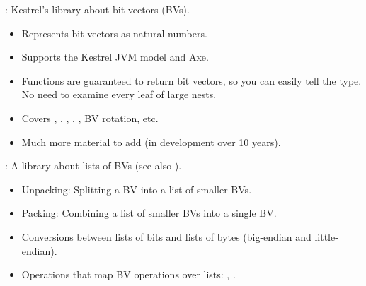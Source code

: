 \begin{frame}

\newlibtitle

:
Kestrel's library about bit-vectors (BVs).
\begin{itemize}
\item Represents bit-vectors as natural numbers.
\item Supports the Kestrel JVM model and Axe.
\item Functions are guaranteed to return bit vectors, so you can easily tell the
  type.  No need to examine every leaf of large nests.
\item Covers , , , , , BV rotation, etc.
\item Much more material to add (in development over 10 years).
\end{itemize}

\separation

:
A library about lists of BVs (see also ).
\begin{itemize}
\item Unpacking: Splitting a BV into a list of smaller BVs.
\item Packing: Combining a list of smaller BVs into a single BV.
\item Conversions between lists of bits and lists of bytes (big-endian and little-endian).
\item Operations that map BV operations over lists: , .
\end{itemize}

\end{frame}



